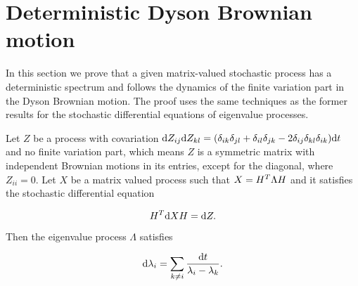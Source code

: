 \section{Deterministic Dyson Brownian motion}

In this section we prove that a given matrix-valued stochastic process has a deterministic spectrum and follows the dynamics of the finite variation part in the Dyson Brownian motion. The proof uses the same techniques as the former results for the stochastic differential equations of eigenvalue processes. 

\begin{theorem}

Let $Z$ be a process with covariation $\mathrm d Z_{ij}\mathrm d Z_{kl} = (\delta_{ik}\delta_{jl} + \delta_{il}\delta_{jk} - 2\delta_{ij}\delta_{kl}\delta_{ik} )\mathrm d t$ and no finite variation part, which means $Z$ is a symmetric matrix with independent Brownian motions in its entries, except for the diagonal, where $Z_{ii} = 0$. Let $X$ be a matrix valued process such that  $X = H^T \Lambda H$ and it satisfies the stochastic differential equation


\begin{equation*}
     H^T \mathrm d X H = \mathrm d Z.
\end{equation*}

Then the eigenvalue process $\Lambda$ satisfies

\begin{equation} \label{eq:deterministic_dyson}
    \mathrm d \lambda_i = \sum_{k\neq i} \frac{\mathrm d t}{\lambda_i - \lambda_k}.
\end{equation}

\end{theorem}

